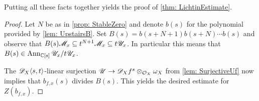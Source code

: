 Putting all these facts together yields the proof of \cref{thm: LichtinEstimate}.
\begin{proof}
  Let $N$ be as in \cref{prop: StableZero} and denote $b(s)$ for the polynomial provided by \cref{lem: UpstairsB}.
  Set $B(s) = b(s+N+1)b(s+N)\cdots b(s)$ and observe that $B(s)\mathscr{M}_x \subseteq t^{N+1}\mathscr{M}_x \subseteq t\mathscr{U}_x$.
  In particular this means that $B(s) \in \operatorname{Ann}_{\mathbb{C}[s]} \mathscr{U}_x / t\mathscr{U}_x$.

  The $\mathscr{D}_X\langle s,t\rangle$-linear surjection $\mathscr{U} \to \mathscr{D}_X f^s \otimes_{\mathcal{O}_X} \omega_X$ from \cref{lem: SurjectiveUf} now implies that $b_{f,x}(s)$ divides $B(s)$.
  This yields the desired estimate for $Z(b_{f,x})$.
\end{proof}
